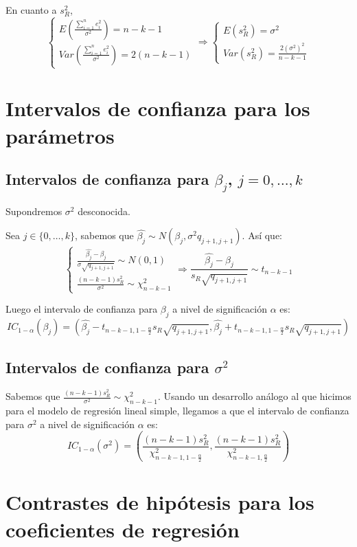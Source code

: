 \documentclass{report}
\theoremstyle{remark}
\theoremstyle{remark}
\theoremstyle{remark}
\theoremstyle{definition}
\theoremstyle{definition}
\theoremstyle{definition}
\begin{document}
En cuanto a $s_R^2$,
$$\begin{cases}
        E(\frac{\sum_{i=1}^n e_i^2}{\sigma^2}) = n-k-1 \\
        Var(\frac{\sum_{i=1}^n e_i^2}{\sigma^2}) = 2(n-k-1)
    \end{cases} \Rightarrow \begin{cases}
        E(s_R^2) = \sigma^2 \\
        Var(s_R^2) = \frac{2(\sigma^2)^2}{n-k-1}
    \end{cases}$$

\section{Intervalos de confianza para los parámetros}
\subsection*{Intervalos de confianza para $\beta_j$, $j = 0, \dots, k$}
Supondremos $\sigma^2$ desconocida.

Sea $j \in \{0, \dots, k\}$, sabemos que $\hat{\beta_j} \sim N(\beta_j, \sigma^2 q_{j+1, j+1})$.
Así que:
$$\begin{cases}
        \frac{\hat{\beta_j} - \beta_j}{\sigma \sqrt{q_{j+1, j+1}}} \sim N(0, 1) \\
        \frac{(n-k-1)s_R^2}{\sigma^2} \sim \chi^2_{n-k-1}
    \end{cases} \Rightarrow \frac{\hat{\beta_j} - \beta_j}{s_R \sqrt{q_{j+1, j+1}}} \sim t_{n-k-1}$$

Luego el intervalo de confianza para $\beta_j$ a nivel de significación $\alpha$ es:
$$IC_{1-\alpha}(\beta_j) = \left( \hat{\beta_j} - t_{n-k-1, 1-\frac{\alpha}{2}} s_R \sqrt{q_{j+1, j+1}}, \hat{\beta_j} + t_{n-k-1, 1-\frac{\alpha}{2}} s_R \sqrt{q_{j+1, j+1}} \right)$$

\subsection*{Intervalos de confianza para $\sigma^2$}
Sabemos que $\frac{(n-k-1)s_R^2}{\sigma^2} \sim \chi^2_{n-k-1}$.
Usando un desarrollo análogo al que hicimos para el modelo de regresión lineal simple, llegamos a que el intervalo de confianza para $\sigma^2$ a nivel de significación $\alpha$ es:
$$IC_{1-\alpha}(\sigma^2) = \left( \frac{(n-k-1)s_R^2}{\chi^2_{n-k-1, 1-\frac{\alpha}{2}}}, \frac{(n-k-1)s_R^2}{\chi^2_{n-k-1, \frac{\alpha}{2}}} \right)$$

\section{Contrastes de hipótesis para los coeficientes de regresión}
\end{document}
